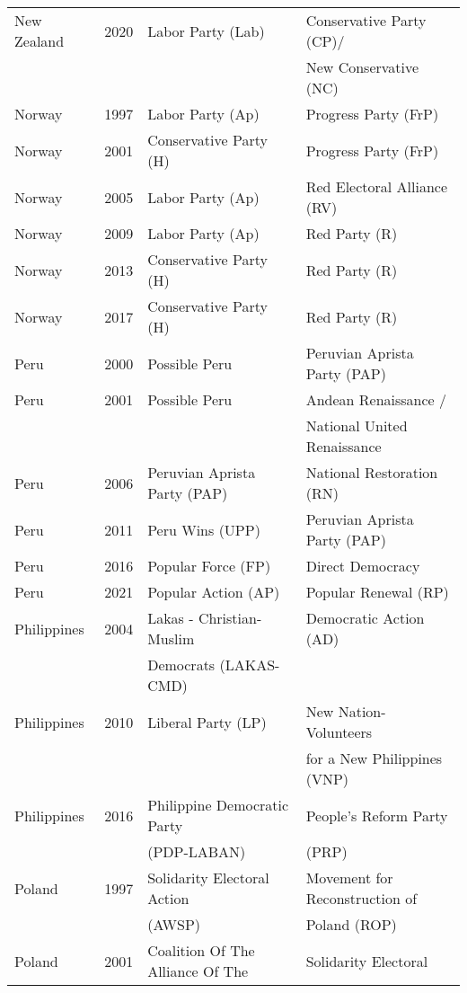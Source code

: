 {\begin{longtable}{|l|c|l|l|}
   New Zealand & 2020 &   Labor Party (Lab) &   Conservative Party (CP)/   \\ 
               &      &         &    New Conservative (NC) \\ 
   Norway & 1997 &   Labor Party (Ap)   &   Progress Party (FrP) \\ 
   Norway & 2001 &   Conservative Party (H) &   Progress Party (FrP) \\ 
   Norway & 2005 &   Labor Party (Ap)   &   Red Electoral Alliance (RV) \\ 
   Norway & 2009 &   Labor Party (Ap)   &   Red Party (R)   \\ 
   Norway & 2013 &   Conservative Party (H) &   Red Party (R)   \\ 
   Norway & 2017 &   Conservative Party (H) &   Red Party (R)   \\ 
   Peru & 2000 &   Possible Peru   &   Peruvian Aprista Party (PAP)   \\ 
   Peru & 2001 &   Possible Peru   &   Andean Renaissance / \\ 
               &      &         &    National United Renaissance    \\ 
   Peru & 2006 &   Peruvian Aprista Party (PAP)   &   National Restoration (RN) \\ 
   Peru & 2011 &   Peru Wins (UPP)   &   Peruvian Aprista Party (PAP)   \\ 
   Peru & 2016 &   Popular Force (FP)   &   Direct Democracy \\ 
  Peru & 2021 &   Popular Action (AP) &   Popular Renewal (RP)   \\ 
  Philippines & 2004 &   Lakas - Christian-Muslim   &   Democratic Action (AD) \\ 
    &   &   Democrats (LAKAS-CMD) &   \\ 
  Philippines & 2010 &   Liberal Party (LP) &   New Nation- Volunteers  \\ 
    &   &     &    for a New Philippines (VNP) \\ 
   Philippines & 2016 &   Philippine Democratic Party  &   People's Reform Party   \\ 
    &  &     (PDP-LABAN) &    (PRP) \\ 
  Poland & 1997 &   Solidarity Electoral Action   &   Movement for Reconstruction of  \\ 
               &      &      (AWSP)    &    Poland (ROP) \\ 
  Poland & 2001 &   Coalition Of The Alliance Of The  &   Solidarity Electoral    \\ 

\end{longtable}}
